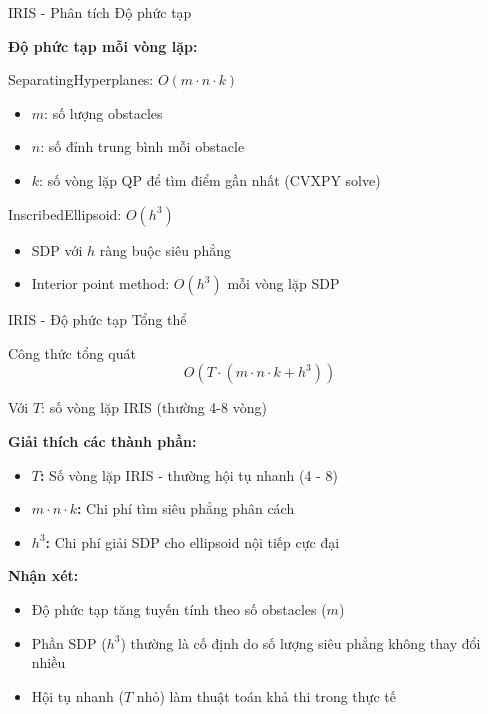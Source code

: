 \documentclass[aspectratio=169]{beamer}
\begin{document}
\begin{frame}{IRIS - Phân tích Độ phức tạp}

    \textbf{Độ phức tạp mỗi vòng lặp:}
    
    \vspace{0.5em}
    \begin{block}{SeparatingHyperplanes: $O(m \cdot n \cdot k)$}
        \small
        \begin{itemize}
            \item $m$: số lượng obstacles
            \item $n$: số đỉnh trung bình mỗi obstacle
            \item $k$: số vòng lặp QP để tìm điểm gần nhất (CVXPY solve)
        \end{itemize}
    \end{block}

    \vspace{0.3em}
    \begin{block}{InscribedEllipsoid: $O(h^3)$}
        \small
        \begin{itemize}
            \item SDP với $h$ ràng buộc siêu phẳng
            \item Interior point method: $O(h^3)$ mỗi vòng lặp SDP
        \end{itemize}
    \end{block}

\end{frame}

\begin{frame}{IRIS - Độ phức tạp Tổng thể}

    \begin{block}{Công thức tổng quát}
        \[
            O(T \cdot (m \cdot n \cdot k + h^3))
        \]
        
        \small
        Với $T$: số vòng lặp IRIS (thường 4-8 vòng)
    \end{block}

    \vspace{1em}
    \textbf{Giải thích các thành phần:}
    \begin{itemize}
        \item \textbf{$T$:} Số vòng lặp IRIS - thường hội tụ nhanh (4 - 8)
        \item \textbf{$m \cdot n \cdot k$:} Chi phí tìm siêu phẳng phân cách
        \item \textbf{$h^3$:} Chi phí giải SDP cho ellipsoid nội tiếp cực đại
    \end{itemize}

    \vspace{0.5em}
    \textbf{Nhận xét:}
    \begin{itemize}
        \item Độ phức tạp tăng tuyến tính theo số obstacles ($m$)
        \item Phần SDP ($h^3$) thường là cố định do số lượng siêu phẳng không thay đổi nhiều
        \item Hội tụ nhanh ($T$ nhỏ) làm thuật toán khả thi trong thực tế
    \end{itemize}

\end{frame}
\end{document}
